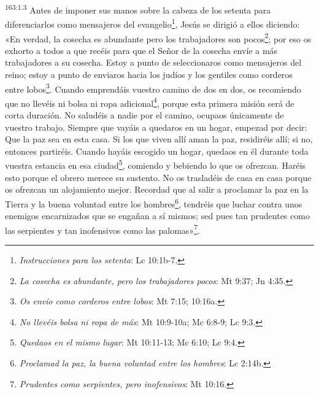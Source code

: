 \par 
\textsuperscript{163:1.3} Antes de imponer sus manos sobre la cabeza de los setenta para diferenciarlos como mensajeros del evangelio\footnote{\textit{Instrucciones para los setenta}: Lc 10:1b-7.}, Jesús se dirigió a ellos diciendo: «En verdad, la cosecha es abundante pero los trabajadores son pocos\footnote{\textit{La cosecha es abundante, pero los trabajadores pocos}: Mt 9:37; Jn 4:35.}; por eso os exhorto a todos a que recéis para que el Señor de la cosecha envíe a más trabajadores a su cosecha. Estoy a punto de seleccionaros como mensajeros del reino; estoy a punto de enviaros hacia los judíos y los gentiles como corderos entre lobos\footnote{\textit{Os envío como corderos entre lobos}: Mt 7:15; 10:16a.}. Cuando emprendáis vuestro camino de dos en dos, os recomiendo que no llevéis ni bolsa ni ropa adicional\footnote{\textit{No llevéis bolsa ni ropa de más}: Mt 10:9-10a; Mc 6:8-9; Lc 9:3.}, porque esta primera misión será de corta duración. No saludéis a nadie por el camino, ocupaos únicamente de vuestro trabajo. Siempre que vayáis a quedaros en un hogar, empezad por decir: Que la paz sea en esta casa. Si los que viven allí aman la paz, residiréis allí; si no, entonces partiréis. Cuando hayáis escogido un hogar, quedaos en él durante toda vuestra estancia en esa ciudad\footnote{\textit{Quedaos en el mismo lugar}: Mt 10:11-13; Mc 6:10; Lc 9:4.}, comiendo y bebiendo lo que os ofrezcan. Haréis esto porque el obrero merece su sustento. No os trasladéis de casa en casa porque os ofrezcan un alojamiento mejor. Recordad que al salir a proclamar la paz en la Tierra y la buena voluntad entre los hombres\footnote{\textit{Proclamad la paz, la buena voluntad entre los hombres}: Lc 2:14b.}, tendréis que luchar contra unos enemigos encarnizados que se engañan a sí mismos; sed pues tan prudentes como las serpientes y tan inofensivos como las palomas»\footnote{\textit{Prudentes como serpientes, pero inofensivos}: Mt 10:16.}.

